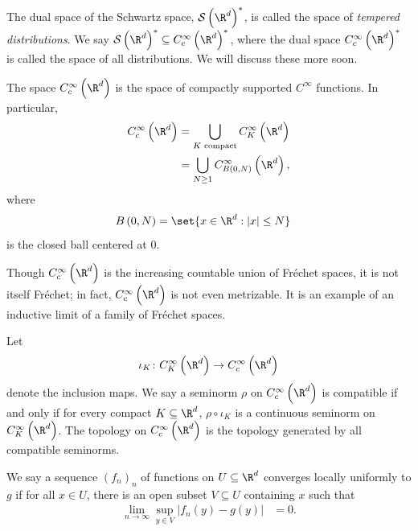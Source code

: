 \documentclass[10pt]{mypackage}
\begin{document}
\begin{example}
  The dual space of the Schwartz space, $ \mathcal{S}\left( \R^d \right)^{\ast} $, is called the space of \textit{tempered distributions}. We say $ \mathcal{S}\left( \R^d \right)^{\ast}\subseteq C_c^{\infty}\left( \R^d \right)^{\ast} $, where the dual space $C_c^{\infty}\left( \R^d \right)^{\ast}$ is called the space of all distributions. We will discuss these more soon.

  The space $C_c^{\infty}\left( \R^d \right)$ is the space of compactly supported $C^{\infty}$ functions. In particular,
  \begin{align*}
    C_c^{\infty} \left( \R^d \right) &= \bigcup_{K\text{ compact}} C_K^{\infty}\left( \R^d \right)\\
                                     &= \bigcup_{N\geq 1} C_{B\left(0,N\right)}^{\infty}\left( \R^d \right),
  \end{align*}
  where 
  \begin{align*}
    B\left( 0,N \right) &= \set{x\in \R^d : \left\vert x \right\vert \leq N}
  \end{align*}
  is the closed ball centered at $0$.

  Though $C_c^{\infty}\left( \R^d \right)$ is the increasing countable union of Fréchet spaces, it is not itself Fréchet; in fact, $C_c^{\infty}\left( \R^d \right)$ is not even metrizable. It is an example of an inductive limit of a family of Fréchet spaces.

  Let
  \begin{align*}
    \iota_K\colon C_K^{\infty} \left( \R^d \right)\rightarrow C_c^{\infty}\left( \R^d \right)
  \end{align*}
  denote the inclusion maps. We say a seminorm $\rho$ on $C_c^{\infty}\left( \R^d \right)$ is compatible if and only if for every compact $K\subseteq \R^d$, $\rho\circ \iota_K$ is a continuous seminorm on $C_K^{\infty}\left( \R^d \right)$. The topology on $ C_c^{\infty} \left( \R^d \right)$ is the topology generated by all compatible seminorms.
\end{example}
\begin{definition}
  We say a sequence $\left( f_n \right)_n$ of functions on $U\subseteq \R^d$ converges locally uniformly to $g$ if for all $x\in U$, there is an open subset $V\subseteq U$ containing $x$ such that
  \begin{align*}
    \lim_{n\rightarrow\infty} \sup_{y\in V} \left\vert f_n(y)-g(y) \right\vert &= 0.
  \end{align*}
\end{definition}
\end{document}
